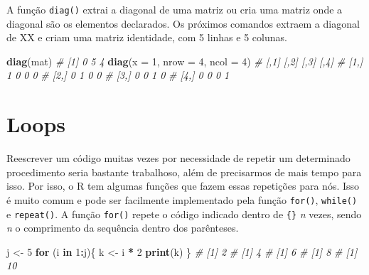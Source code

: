 \documentclass[
]{book}
\newenvironment{Shaded}{\begin{snugshade}}{\end{snugshade}}
\newcommand{\CommentTok}[1]{\textcolor[rgb]{0.56,0.35,0.01}{\textit{#1}}}
\newcommand{\ControlFlowTok}[1]{\textcolor[rgb]{0.13,0.29,0.53}{\textbf{#1}}}
\newcommand{\DataTypeTok}[1]{\textcolor[rgb]{0.13,0.29,0.53}{#1}}
\newcommand{\DecValTok}[1]{\textcolor[rgb]{0.00,0.00,0.81}{#1}}
\newcommand{\KeywordTok}[1]{\textcolor[rgb]{0.13,0.29,0.53}{\textbf{#1}}}
\newcommand{\NormalTok}[1]{#1}
\newcommand{\OperatorTok}[1]{\textcolor[rgb]{0.81,0.36,0.00}{\textbf{#1}}}
\newcommand{\StringTok}[1]{\textcolor[rgb]{0.31,0.60,0.02}{#1}}
\begin{document}
\begin{Shaded}
\end{Shaded}

A função \texttt{diag()}  extrai a diagonal de uma matriz ou cria uma matriz onde a diagonal são os elementos declarados. Os próximos comandos extraem a diagonal de XX e criam uma matriz identidade, com 5 linhas e 5 colunas.

\begin{Shaded}
\begin{Highlighting}[]
\KeywordTok{diag}\NormalTok{(mat)}
\CommentTok{# [1] 0 5 4}
\KeywordTok{diag}\NormalTok{(}\DataTypeTok{x =} \DecValTok{1}\NormalTok{, }\DataTypeTok{nrow =} \DecValTok{4}\NormalTok{, }\DataTypeTok{ncol =} \DecValTok{4}\NormalTok{)}
\CommentTok{#      [,1] [,2] [,3] [,4]}
\CommentTok{# [1,]    1    0    0    0}
\CommentTok{# [2,]    0    1    0    0}
\CommentTok{# [3,]    0    0    1    0}
\CommentTok{# [4,]    0    0    0    1}
\end{Highlighting}
\end{Shaded}

\hypertarget{loops}{%
\chapter{Loops}\label{loops}}


Reescrever um código muitas vezes por necessidade de repetir um determinado procedimento seria bastante trabalhoso, além de precisarmos de mais tempo para isso. Por isso, o R tem algumas funções que fazem essas repetições para nós. Isso é muito comum e pode ser facilmente implementado pela função \texttt{for()}, \texttt{while()} e \texttt{repeat()}.
A função \texttt{for()} repete o código indicado dentro de \texttt{\{\}} \emph{n} vezes, sendo \emph{n} o comprimento da sequência dentro dos parênteses.

\begin{Shaded}
\begin{Highlighting}[]
\NormalTok{j <-}\StringTok{ }\DecValTok{5}
\ControlFlowTok{for}\NormalTok{ (i }\ControlFlowTok{in} \DecValTok{1}\OperatorTok{:}\NormalTok{j)\{}
\NormalTok{  k <-}\StringTok{ }\NormalTok{i }\OperatorTok{*}\StringTok{ }\DecValTok{2}
  \KeywordTok{print}\NormalTok{(k)}
\NormalTok{\}}
\CommentTok{# [1] 2}
\CommentTok{# [1] 4}
\CommentTok{# [1] 6}
\CommentTok{# [1] 8}
\CommentTok{# [1] 10}
\end{Highlighting}
\end{Shaded}
\end{document}
